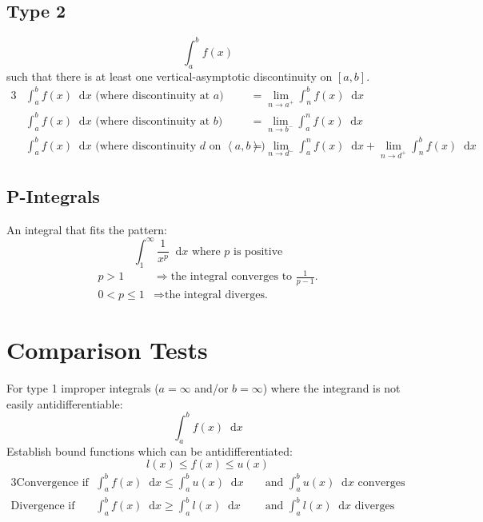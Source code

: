 \documentclass[12pt]{article}
\renewcommand*{\implies}{\Rightarrow}
\newcommand*{\fixmath}{\makebox{}\vspace{\glueexpr-\baselineskip-\abovedisplayskip}}
\newcommand*{\D}[1]{\mathop{}\!\mathrm{d} #1}
\newenvironment{rmaskip}{\setlength{\abovedisplayskip}{0pt}\fixmath%
  \ignorespaces}{\ignorespacesafterend}
\newenvironment{rmskip}{\setlength{\abovedisplayskip}{0pt}%
  \setlength{\belowdisplayskip}{0pt}\fixmath\ignorespaces}%
  {\ignorespacesafterend}
\begin{document}
\subsection*{Type 2}
\begin{rmaskip}
  \[
    \int_a^b f(x)
  \]
\end{rmaskip}
such that there is at least one vertical-asymptotic discontinuity on \([a,b]\).
\begin{alignat*}{3}
  &\int_a^b f(x) \D{x} \text{ (where discontinuity at \(a\)) }
    &&= \lim_{n \to a^+} \int_n^b f(x) \D{x}\\
  &\int_a^b f(x) \D{x} \text{ (where discontinuity at \(b\)) }
    &&= \lim_{n \to b^-} \int_a^n f(x) \D{x}\\
  &\int_a^b f(x) \D{x} \text{ (where discontinuity \(d\) on
    \(\left<a,b\right>\)) } &&= \lim_{n \to d^-} \int_a^n f(x) \D{x} +
    \lim_{n \to d^+} \int_n^b f(x) \D{x}
\end{alignat*}
\subsection*{P-Integrals}
An integral that fits the pattern:
\[
  \int_1^\infty \frac{1}{x^p} \D{x} \text{ where \(p\) is positive}
\]
\begin{rmaskip}
  \begin{align*}
    p > 1 &\implies \text{the integral converges to \(\tfrac{1}{p-1}\).}\\
    0 < p \le 1 &\implies \text{the integral diverges.}
  \end{align*}
\end{rmaskip}
\section*{Comparison Tests}
For type 1 improper integrals (\(a = \infty\) and\slash or \(b = \infty\))
where the integrand is not easily antidifferentiable:
\[
  \int_a^b f(x) \D{x}
\]
Establish bound functions which can be antidifferentiated:
\[
  l(x) \le f(x) \le u(x)
\]
\begin{rmskip}
  \begin{alignat*}{3}
    \text{Convergence if } &\int_a^b f(x) \D{x} \le \int_a^b u(x) \D{x}
      &&\text{ and } \int_a^b u(x) \D{x} \text{ converges}\\
    \text{Divergence if } &\int_a^b f(x) \D{x} \ge \int_a^b l(x) \D{x}
      &&\text{ and } \int_a^b l(x) \D{x} \text{ diverges}
  \end{alignat*}
\end{rmskip}
\end{document}
